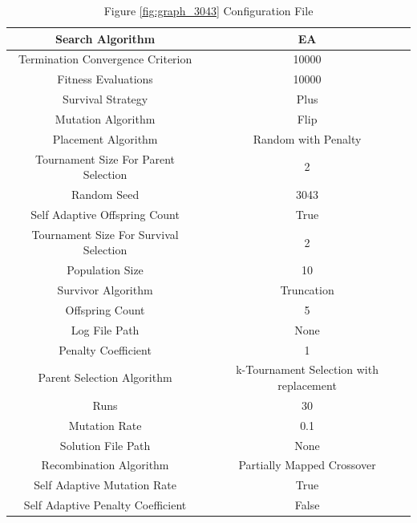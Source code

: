 \documentclass{standalone}
\begin{document}
\begin{table}[!htb]
	\centering
	\caption{Figure \ref{fig:graph_3043} Configuration File}
	\label{tab:graph_3043}
	\begin{tabular}{| c | c |}
		\hline
		Search Algorithm		& EA		 \\
		\hline
		Termination Convergence Criterion		& 10000		 \\
		\hline
		Fitness Evaluations		& 10000		 \\
		\hline
		Survival Strategy		& Plus		 \\
		\hline
		Mutation Algorithm		& Flip		 \\
		\hline
		Placement Algorithm		& Random with Penalty		 \\
		\hline
		Tournament Size For Parent Selection		& 2		 \\
		\hline
		Random Seed		& 3043		 \\
		\hline
		Self Adaptive Offspring Count		& True		 \\
		\hline
		Tournament Size For Survival Selection		& 2		 \\
		\hline
		Population Size		& 10		 \\
		\hline
		Survivor Algorithm		& Truncation		 \\
		\hline
		Offspring Count		& 5		 \\
		\hline
		Log File Path		& None		 \\
		\hline
		Penalty Coefficient		& 1		 \\
		\hline
		Parent Selection Algorithm		& k-Tournament Selection with replacement		 \\
		\hline
		Runs		& 30		 \\
		\hline
		Mutation Rate		& 0.1		 \\
		\hline
		Solution File Path		& None		 \\
		\hline
		Recombination Algorithm		& Partially Mapped Crossover		 \\
		\hline
		Self Adaptive Mutation Rate		& True		 \\
		\hline
		Self Adaptive Penalty Coefficient		& False		 \\
		\hline
	\end{tabular}
\end{table}
\end{document}
